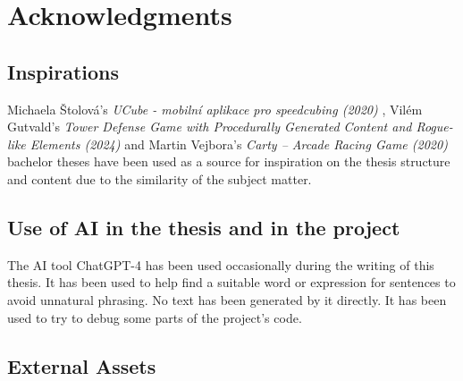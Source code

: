 \chapter{Acknowledgments}

\section{Inspirations}
Michaela Štolová's \textit{UCube - mobilní aplikace pro speedcubing (2020)} \cite{Stolova2020}, Vilém Gutvald's \textit{Tower Defense Game with Procedurally Generated Content and Rogue-like Elements (2024)} \cite{Gutvald2024} and Martin Vejbora's \textit{Carty – Arcade Racing Game (2020)} \cite{Vejbora2020} bachelor theses have been used as a source for inspiration on the thesis structure and content due to the similarity of the subject matter.

\section{Use of AI in the thesis and in the project}
The AI tool ChatGPT-4 has been used occasionally during the writing of this thesis. It has been used to help find a suitable word or expression for sentences to avoid unnatural phrasing. No text has been generated by it directly. It has been used to try to debug some parts of the project's code.

\section{External Assets}
